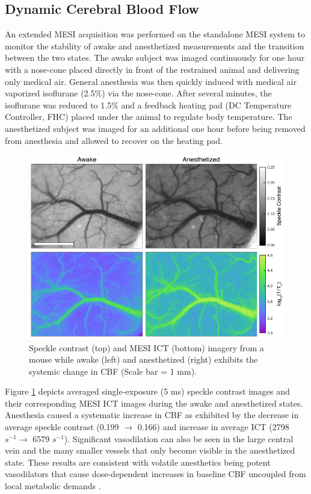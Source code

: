 \subsection{Dynamic Cerebral Blood Flow} \label{ssec:dynamicawakecbf}

An extended MESI acquisition was performed on the standalone MESI system to monitor the stability of awake and anesthetized measurements and the transition between the two states. The awake subject was imaged continuously for one hour with a nose-cone placed directly in front of the restrained animal and delivering only medical air. General anesthesia was then quickly induced with medical air vaporized isoflurane (2.5\%) via the nose-cone. After several minutes, the isoflurane was reduced to 1.5\% and a feedback heating pad (DC Temperature Controller, FHC) placed under the animal to regulate body temperature. The anesthetized subject was imaged for an additional one hour before being removed from anesthesia and allowed to recover on the heating pad.

\begin{figure}
    \includegraphics{figures/chapter_5/speckleawakeanes.pdf}
    \caption{
        \label{fig:speckleawakeanes}
        Speckle contrast (top) and MESI ICT (bottom) imagery from a mouse while awake (left) and anesthetized (right) exhibits the systemic change in CBF (Scale bar = 1 mm).
    }
\end{figure}

Figure \ref{fig:speckleawakeanes} depicts averaged single-exposure (5 ms) speckle contrast images and their corresponding MESI ICT images during the awake and anesthetized states. Anesthesia caused a systematic increase in CBF as exhibited by the decrease in average speckle contrast (0.199 $\to$ 0.166) and increase in average ICT (2798 $s^{-1} \to$ 6579 $s^{-1}$). Significant vasodilation can also be seen in the large central vein and the many smaller vessels that only become visible in the anesthetized state. These results are consistent with volatile anesthetics being potent vasodilators that cause dose-dependent increases in baseline CBF uncoupled from local metabolic demands \cite{Masamoto:2012bj}.

